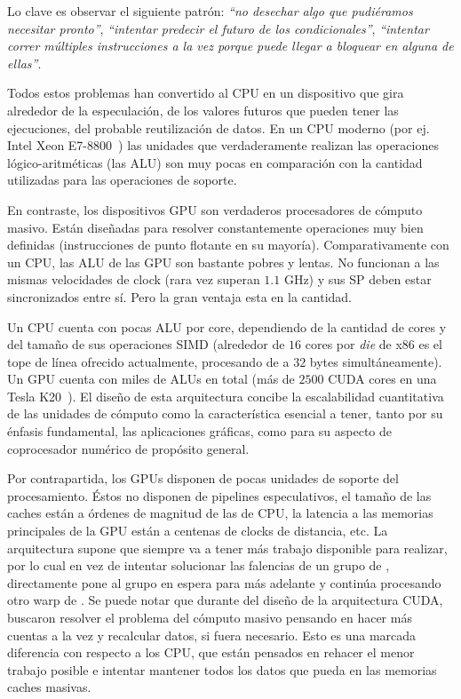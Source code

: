 Lo clave es observar el siguiente patr\'on: \emph{``no desechar algo que pudi\'eramos necesitar pronto''}, \emph{``intentar predecir el futuro de los condicionales''}, \emph{``intentar correr m\'ultiples instrucciones a la vez porque puede llegar a bloquear en alguna de ellas''}.

Todos estos problemas han convertido al CPU en un dispositivo que gira alrededor de la especulaci\'on, de los valores futuros que pueden tener las ejecuciones, del probable reutilizaci\'on de datos.
En un CPU moderno (por ej. Intel Xeon E7-8800~\cite{XeonE78800Spec}) las unidades que verdaderamente realizan las operaciones l\'ogico-aritm\'eticas (las ALU) son muy pocas en comparaci\'on con la cantidad utilizadas para las operaciones de soporte.

En contraste, los dispositivos GPU son verdaderos procesadores de c\'omputo masivo.
Est\'an dise\~nadas para resolver constantemente operaciones muy bien definidas (instrucciones de punto flotante en su mayor\'ia).
Comparativamente con un CPU, las ALU de las GPU son bastante pobres y lentas.
No funcionan a las mismas velocidades de clock (rara vez superan $1.1$ GHz) y sus SP deben estar sincronizados entre s\'i.
Pero la gran ventaja esta en la cantidad.

Un CPU cuenta con pocas ALU por core, dependiendo de la cantidad de cores y del tama\~no de sus operaciones SIMD (alrededor de $16$ cores por \emph{die} de x86 es el tope de l\'inea ofrecido actualmente, procesando de a $32$ bytes simult\'aneamente).
Un GPU cuenta con miles de ALUs en total (m\'as de $2500$ CUDA cores en una Tesla K20~\cite{NvidiaKeplerDatasheet}).
El dise\~no de esta arquitectura concibe la escalabilidad cuantitativa de las unidades de c\'omputo como la caracter\'istica esencial a tener, tanto por su \'enfasis fundamental, las aplicaciones gr\'aficas, como para su aspecto de coprocesador num\'erico de prop\'osito general.

Por contrapartida, los GPUs disponen de pocas unidades de soporte del procesamiento.
\'Estos no disponen de pipelines especulativos, el tama\~no de las caches est\'an a \'ordenes de magnitud de las de CPU, la latencia a las memorias principales de la GPU est\'an a centenas de clocks de distancia, etc.
La arquitectura supone que siempre va a tener m\'as trabajo disponible para realizar, por lo cual en vez de intentar solucionar las falencias de un grupo de \threads{}, directamente
pone al grupo en espera para m\'as adelante y contin\'ua procesando otro warp de \threads{}.
Se puede notar que durante del dise\~no de la arquitectura CUDA, buscaron resolver el problema del c\'omputo masivo pensando en hacer m\'as cuentas a la vez y recalcular datos, si fuera necesario.
Esto es una marcada diferencia con respecto a los CPU, que est\'an pensados en rehacer el menor trabajo posible e intentar mantener todos los datos que pueda en las memorias caches masivas.

